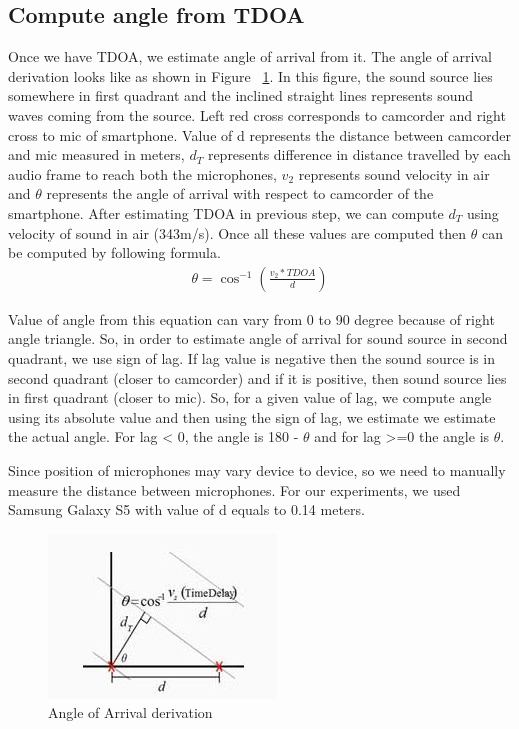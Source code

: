\subsection{Compute angle from TDOA}
Once we have TDOA, we estimate angle of arrival from it. The angle of arrival derivation looks like as shown in Figure ~\ref{fig:aoaDerivation}. In this figure, the sound source lies somewhere in first quadrant and the inclined straight lines represents sound waves coming from the source. Left red cross corresponds to camcorder and right cross to mic of smartphone. Value of d represents the distance between camcorder and mic measured in meters, $d_T$ represents difference in distance travelled by each audio frame to reach both the microphones, $v_2$ represents sound velocity in air and $\theta$ represents the angle of arrival with respect to camcorder of the smartphone. After estimating TDOA in previous step, we can compute  $d_T$ using velocity of sound in air (343m/s). Once all these values are computed then $\theta$ can be computed by following formula.
\begin{gather*}
\theta = \cos^{-1}(\frac{v_2 * TDOA}{d})
\end{gather*}


Value of angle from this equation can vary from 0 to 90 degree because of right angle triangle. So, in order to estimate angle of arrival for sound source in second quadrant, we use sign of lag. If lag value is negative then the sound source is in second quadrant (closer to camcorder) and if it is positive, then sound source lies in first quadrant (closer to mic). So, for a given value of lag, we compute angle using its absolute value and then using the sign of lag, we estimate we estimate the actual angle. For lag < 0, the angle is 180 - $\theta$ and for lag >=0 the angle is $\theta$.

Since position of microphones may vary device to device, so we need to manually measure the distance between microphones. For our experiments, we used Samsung Galaxy S5 with value of d equals to 0.14 meters.

\begin{figure}
\centering
\includegraphics{figures/angle-of-arrival.jpg}
\caption{Angle of Arrival derivation ~\protect\cite{derivationSource}}
\label{fig:aoaDerivation}
\end{figure}

